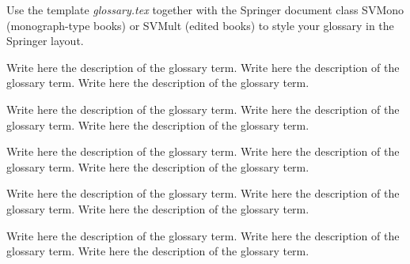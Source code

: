 %
%



Use the template \emph{glossary.tex} together with the Springer document class SVMono (monograph-type books) or SVMult (edited books) to style your glossary in the Springer layout.


 Write here the description of the glossary term. Write here the description of the glossary term. Write here the description of the glossary term.

 Write here the description of the glossary term. Write here the description of the glossary term. Write here the description of the glossary term.

 Write here the description of the glossary term. Write here the description of the glossary term. Write here the description of the glossary term.

 Write here the description of the glossary term. Write here the description of the glossary term. Write here the description of the glossary term.

 Write here the description of the glossary term. Write here the description of the glossary term. Write here the description of the glossary term.
